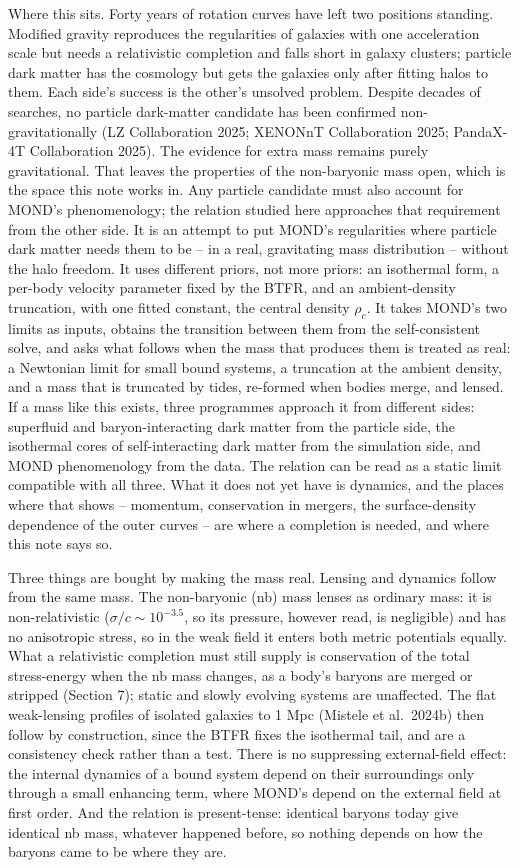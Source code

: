 \documentclass[
  10pt,
]{article}
\begin{document}
Where this sits. Forty years of rotation curves have left two positions
standing. Modified gravity reproduces the regularities of galaxies with
one acceleration scale but needs a relativistic completion and falls
short in galaxy clusters; particle dark matter has the cosmology but gets the
galaxies only after fitting halos to them. Each side's success is the
other's unsolved problem. Despite decades of searches, no particle
dark-matter candidate has been confirmed non-gravitationally (LZ
Collaboration 2025; XENONnT Collaboration 2025; PandaX-4T Collaboration
2025). The evidence for extra mass remains purely gravitational. That
leaves the properties of the non-baryonic mass open, which is the space
this note works in. Any particle candidate must also account for MOND's
phenomenology; the relation studied here approaches that requirement from
the other side. It is an
attempt to put MOND's regularities where particle dark matter needs them
to be -- in a real, gravitating mass distribution -- without the halo
freedom. It uses different priors, not more priors: an isothermal form,
a per-body velocity parameter fixed by the BTFR, and an ambient-density
truncation, with one fitted constant, the central density $\rho_c$. It takes MOND's two limits as inputs, obtains the transition
between them from the self-consistent solve, and asks what follows when the mass that produces them is
treated as real: a Newtonian limit for small bound systems, a truncation
at the ambient density, and a mass that is truncated by tides, re-formed when bodies merge, and lensed. If a mass like this exists, three programmes approach it from
different sides: superfluid and baryon-interacting dark matter from the
particle side, the isothermal cores of self-interacting dark matter from
the simulation side, and MOND phenomenology from the data. The relation
can be read as a static limit compatible with all three. What it does not yet have is
dynamics, and the places where that shows -- momentum, conservation in
mergers, the surface-density dependence of the outer curves -- are where
a completion is needed, and where this note says so.

Three things are bought by making the mass real. Lensing and dynamics follow from the same mass. The non-baryonic (nb) mass lenses as ordinary mass: it is non-relativistic ($\sigma/c\sim10^{-3.5}$, so its pressure, however read, is negligible) and has no anisotropic stress, so in the weak field it enters both metric potentials equally. What a relativistic completion must still supply is conservation of the total stress-energy when the nb mass changes, as a body's baryons are merged or stripped (Section 7); static and slowly evolving systems are unaffected. The flat weak-lensing profiles of isolated galaxies to 1 Mpc (Mistele et al.~2024b) then follow by construction, since the BTFR fixes the isothermal tail, and are a consistency check rather than a test. There is no suppressing external-field
effect: the internal dynamics of a bound system depend on their
surroundings only through a small enhancing term, where MOND's depend on
the external field at first order. And the relation is present-tense:
identical baryons today give identical nb mass, whatever happened
before, so nothing depends on how the baryons came to be where they are.
\end{document}
